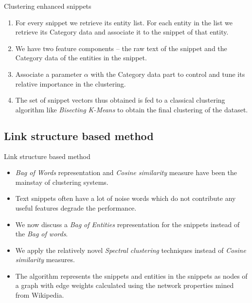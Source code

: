 \documentclass{beamer}
\begin{document}
\begin{frame}{Clustering enhanced snippets}
\begin{enumerate}
\item For every snippet we retrieve its entity list. For each entity in the
list we retrieve its Category data and associate it to the snippet of
that entity. 
\item We have two feature components -- the raw text of the snippet
  and the Category data of the entities in the snippet. 
\item Associate a parameter $\alpha$ with the Category data
  part to control and tune its relative importance in the
  clustering. 
\item The set of snippet vectors thus obtained is fed to a classical
  clustering algorithm like {\it Bisecting K-Means} to obtain the
  final clustering of the dataset. 
\end{enumerate}
\end{frame}
\subsection{Link structure based method}
\begin{frame}{Link structure based method}
\begin{itemize}
  \item {\it Bag of Words} representation and {\it Cosine similarity}
    measure have been the mainstay of clustering systems.
  \item Text snippets often have a lot of noise words which do not
    contribute any useful features degrade the performance. 
  \item We now discuss a {\it Bag of Entities} representation for the
    snippets instead of the {\it Bag of words}.
  \item We apply the relatively novel {\it Spectral clustering}
    techniques instead of {\it Cosine similarity} measures. 
  \item The algorithm represents the snippets and entities in the
    snippets as nodes of a graph with edge weights calculated using
    the network properties mined from Wikipedia. 
\end{itemize}
\end{frame}
\end{document}
